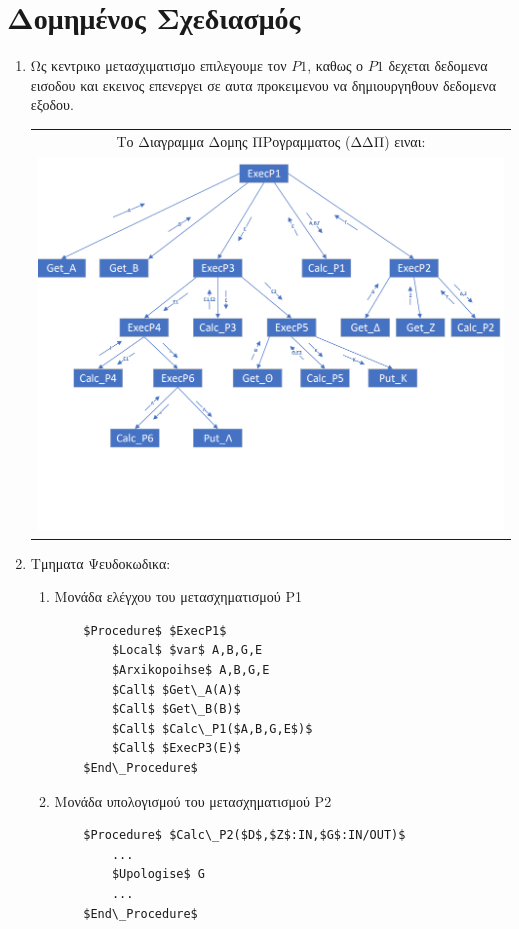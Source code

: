 \documentclass[12pt]{article}
\begin{document}
\newpage
\section*{Δομημένος Σχεδιασμός}
\begin{enumerate}

\item Ως κεντρικο μετασχιματισμο επιλεγουμε τον $P1$, καθως ο $P1$ δεχεται δεδομενα εισοδου και εκεινος επενεργει σε αυτα προκειμενου να δημιουργηθουν δεδομενα εξοδου.\\
\begin{center}
\begin{tabular}{c}
Το Διαγραμμα Δομης ΠΡογραμματος (ΔΔΠ) ειναι:\\
\includegraphics[scale=0.8]{MerosG/DDP.png}
\end{tabular}
\end{center}

\newpage
\item Τμηματα Ψευδοκωδικα:
\begin{enumerate}[label*=\roman*]
	\item Mονάδα ελέγχου του μετασχηματισμού Ρ1
	
	\begin{lstlisting}
	$Procedure$ $ExecP1$
		$Local$ $var$ A,B,G,E
		$Arxikopoihse$ A,B,G,E
		$Call$ $Get\_A(A)$
		$Call$ $Get\_B(B)$
		$Call$ $Calc\_P1($A,B,G,E$)$
		$Call$ $ExecP3(E)$
	$End\_Procedure$
	\end{lstlisting}
	
	\item  Μονάδα υπολογισμού του μετασχηματισμού Ρ2
	\begin{lstlisting}
	$Procedure$ $Calc\_P2($D$,$Z$:IN,$G$:IN/OUT)$
		...
		$Upologise$ G
		...
	$End\_Procedure$
	\end{lstlisting}
	

\end{enumerate}
\end{enumerate}
\end{document}
